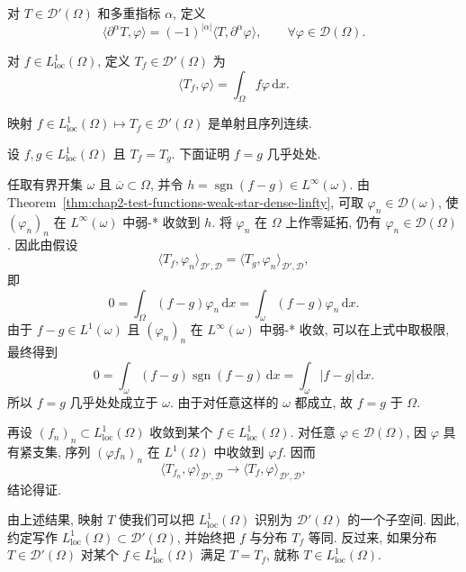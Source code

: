 \begin{Definition}
\label{def:chap2-distribution-derivative}
对 $T\in\mathcal{D}'(\Omega)$ 和多重指标 $\alpha$, 定义
\[
 \langle\partial^\alpha T,\varphi\rangle
 =(-1)^{|\alpha|}\langle T,\partial^\alpha\varphi\rangle,
 \qquad\forall\varphi\in\mathcal{D}(\Omega).
\]
\end{Definition}

对 $f\in L^1_{\mathrm{loc}}(\Omega)$, 定义 $T_f\in\mathcal{D}'(\Omega)$ 为
\[
 \langle T_f,\varphi\rangle=\int_\Omega f\varphi\,\mathrm{d}x.
\]

\begin{Proposition}
\label{prop:chap2-functions-embed-distributions}
映射 $f\in L^1_{\mathrm{loc}}(\Omega)\mapsto T_f\in\mathcal{D}'(\Omega)$ 是单射且序列连续.
\end{Proposition}

\begin{Proof}
设 $f,g\in L^1_{\mathrm{loc}}(\Omega)$ 且 $T_f=T_g$. 下面证明 $f=g$ 几乎处处.

任取有界开集 $\omega$ 且 $\overline\omega\subset\Omega$, 并令 $h=\operatorname{sgn}(f-g)\in L^\infty(\omega)$. 由 Theorem~\ref{thm:chap2-test-functions-weak-star-dense-linfty}, 可取 $\varphi_n\in\mathcal{D}(\omega)$, 使 $(\varphi_n)_n$ 在 $L^\infty(\omega)$ 中弱-* 收敛到 $h$. 将 $\varphi_n$ 在 $\Omega$ 上作零延拓, 仍有 $\varphi_n\in\mathcal{D}(\Omega)$. 因此由假设
\[
  \langle T_f,\varphi_n\rangle_{\mathcal{D}',\mathcal{D}}
  =\langle T_g,\varphi_n\rangle_{\mathcal{D}',\mathcal{D}},
\]
即
\[
  0=\int_\Omega(f-g)\varphi_n\,\mathrm{d}x
  =\int_\omega(f-g)\varphi_n\,\mathrm{d}x.
\]
由于 $f-g\in L^1(\omega)$ 且 $(\varphi_n)_n$ 在 $L^\infty(\omega)$ 中弱-* 收敛, 可以在上式中取极限, 最终得到
\[
  0=\int_\omega(f-g)\operatorname{sgn}(f-g)\,\mathrm{d}x
  =\int_\omega|f-g|\,\mathrm{d}x.
\]
所以 $f=g$ 几乎处处成立于 $\omega$. 由于对任意这样的 $\omega$ 都成立, 故 $f=g$ 于 $\Omega$.

再设 $(f_n)_n\subset L^1_{\mathrm{loc}}(\Omega)$ 收敛到某个 $f\in L^1_{\mathrm{loc}}(\Omega)$. 对任意 $\varphi\in\mathcal{D}(\Omega)$, 因 $\varphi$ 具有紧支集, 序列 $(\varphi f_n)_n$ 在 $L^1(\Omega)$ 中收敛到 $\varphi f$. 因而
\[
  \langle T_{f_n},\varphi\rangle_{\mathcal{D}',\mathcal{D}}
  \longrightarrow
  \langle T_f,\varphi\rangle_{\mathcal{D}',\mathcal{D}},
\]
结论得证.
\end{Proof}

由上述结果, 映射 $T$ 使我们可以把 $L^1_{\mathrm{loc}}(\Omega)$ 识别为 $\mathcal{D}'(\Omega)$ 的一个子空间. 因此, 约定写作 $L^1_{\mathrm{loc}}(\Omega)\subset\mathcal{D}'(\Omega)$, 并始终把 $f$ 与分布 $T_f$ 等同. 反过来, 如果分布 $T\in\mathcal{D}'(\Omega)$ 对某个 $f\in L^1_{\mathrm{loc}}(\Omega)$ 满足 $T=T_f$, 就称 $T\in L^1_{\mathrm{loc}}(\Omega)$.

